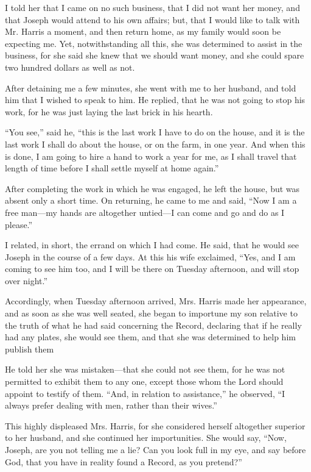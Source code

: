 		I told her that I came on no such business, that I did not want her money, and that Joseph would attend to his own affairs; but, that I would like to talk with Mr. Harris a moment, and then return home, as my family would soon be expecting me. Yet, notwithstanding all this, she was determined to assist in the business, for she said she knew that we should want money, and she could spare two hundred dollars as well as not.

		After detaining me a few minutes, she went with me to her husband, and told him that I wished to speak to him. He replied, that he was not going to stop his work, for he was just laying the last brick in his hearth.

		``You see,'' said he, ``this is the last work I have to do on the house, and it is the last work I shall do about the house, or on the farm, in one year. And when this is done, I am going to hire a hand to work a year for me, as I shall travel that length of time before I shall settle myself at home again.''

		After completing the work in which he was engaged, he left the house, but was absent only a short time. On returning, he came to me and said, ``Now I am a free man---my hands are altogether untied---I can come and go and do as I please.''

		I related, in short, the errand on which I had come. He said, that he would see Joseph in the course of a few days. At this his wife exclaimed, ``Yes, and I am coming to see him too, and I will be there on Tuesday afternoon, and will stop over night.''

		Accordingly, when Tuesday afternoon arrived, Mrs. Harris made her appearance, and as soon as she was well seated, she began to importune my son relative to the truth of what he had said concerning the Record, declaring that if he really had any plates, she would see them, and that she was determined to help him publish them

		He told her she was mistaken---that she could not see them, for he was not permitted to exhibit them to any one, except those whom the Lord should appoint to testify of them. ``And, in relation to assistance,'' he observed, ``I always prefer dealing with men, rather than their wives.''

		This highly displeased Mrs. Harris, for she considered herself altogether superior to her husband, and she continued her importunities. She would say, ``Now, Joseph, are you not telling me a lie? Can you look full in my eye, and say before God, that you have in reality found a Record, as you pretend?''

